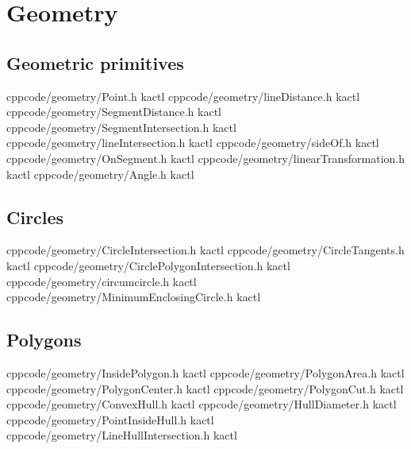 \chapter{Geometry}

\section{Geometric primitives}
    {}{}
    {cpp}{code/geometry/Point.h}
    {kactl}
    {}{}
    {cpp}{code/geometry/lineDistance.h}
    {kactl}
    {}{}
    {cpp}{code/geometry/SegmentDistance.h}
    {kactl}
    {}{}
    {cpp}{code/geometry/SegmentIntersection.h}
    {kactl}
    {}{}
    {cpp}{code/geometry/lineIntersection.h}
    {kactl}
    {}{}
    {cpp}{code/geometry/sideOf.h}
    {kactl}
    {}{}
    {cpp}{code/geometry/OnSegment.h}
    {kactl}
    {}{}
    {cpp}{code/geometry/linearTransformation.h}
    {kactl}
    {}{}
    {cpp}{code/geometry/Angle.h}
    {kactl}

\section{Circles}
    {}{}
    {cpp}{code/geometry/CircleIntersection.h}
    {kactl}
    {}{}
    {cpp}{code/geometry/CircleTangents.h}
    {kactl}
    {}{}
    {cpp}{code/geometry/CirclePolygonIntersection.h}
    {kactl}
    {}{}
    {cpp}{code/geometry/circumcircle.h}
    {kactl}
    {}{}
    {cpp}{code/geometry/MinimumEnclosingCircle.h}
    {kactl}

\section{Polygons}
    {}{}
    {cpp}{code/geometry/InsidePolygon.h}
    {kactl}
    {}{}
    {cpp}{code/geometry/PolygonArea.h}
    {kactl}
    {}{}
    {cpp}{code/geometry/PolygonCenter.h}
    {kactl}
    {}{}
    {cpp}{code/geometry/PolygonCut.h}
    {kactl}
    {}{}
    {cpp}{code/geometry/ConvexHull.h}
    {kactl}
    {}{}
    {cpp}{code/geometry/HullDiameter.h}
    {kactl}
    {}{}
    {cpp}{code/geometry/PointInsideHull.h}
    {kactl}
    {}{}
    {cpp}{code/geometry/LineHullIntersection.h}
    {kactl}

